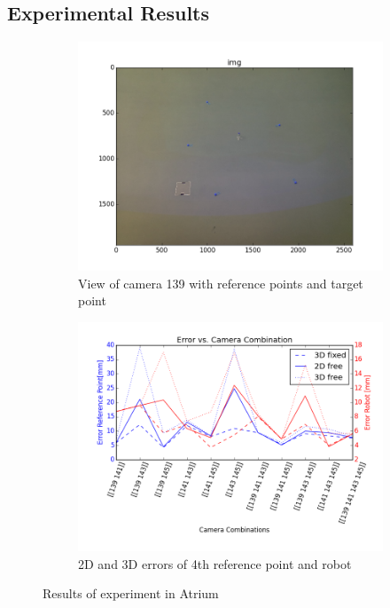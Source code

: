 
\subsection{Experimental Results}

\begin{figure}[H]
    \centering
    \begin{subfigure}{0.49\linewidth}
        \includegraphics[width=\linewidth]{files/res0_img139.png}
        \caption{View of camera 139 with reference points and target point}
    \end{subfigure}
    \begin{subfigure}{0.49\linewidth}
        \includegraphics[width=\linewidth]{files/res0_combi_4.png}
        \caption{2D and 3D errors of 4th reference point and robot}
    \end{subfigure}
    \caption{Results of experiment in Atrium}
    \label{fig:experiment0}
\end{figure}

